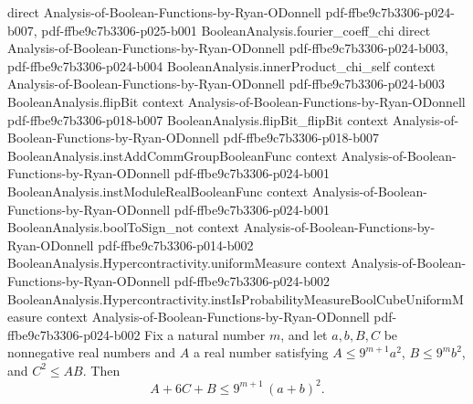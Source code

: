 \begin{lemma}
  {direct}
  {Analysis-of-Boolean-Functions-by-Ryan-ODonnell}
  {pdf-ffbe9c7b3306-p024-b007,
    pdf-ffbe9c7b3306-p025-b001}
\proofstep
  {BooleanAnalysis.fourier_coeff_chi}
  {direct}
  {Analysis-of-Boolean-Functions-by-Ryan-ODonnell}
  {pdf-ffbe9c7b3306-p024-b003,
    pdf-ffbe9c7b3306-p024-b004}
\proofstep
  {BooleanAnalysis.innerProduct_chi_self}
  {context}
  {Analysis-of-Boolean-Functions-by-Ryan-ODonnell}
  {pdf-ffbe9c7b3306-p024-b003}
\proofstep
  {BooleanAnalysis.flipBit}
  {context}
  {Analysis-of-Boolean-Functions-by-Ryan-ODonnell}
  {pdf-ffbe9c7b3306-p018-b007}
\proofstep
  {BooleanAnalysis.flipBit_flipBit}
  {context}
  {Analysis-of-Boolean-Functions-by-Ryan-ODonnell}
  {pdf-ffbe9c7b3306-p018-b007}
\proofstep
  {BooleanAnalysis.instAddCommGroupBooleanFunc}
  {context}
  {Analysis-of-Boolean-Functions-by-Ryan-ODonnell}
  {pdf-ffbe9c7b3306-p024-b001}
\proofstep
  {BooleanAnalysis.instModuleRealBooleanFunc}
  {context}
  {Analysis-of-Boolean-Functions-by-Ryan-ODonnell}
  {pdf-ffbe9c7b3306-p024-b001}
\proofstep
  {BooleanAnalysis.boolToSign_not}
  {context}
  {Analysis-of-Boolean-Functions-by-Ryan-ODonnell}
  {pdf-ffbe9c7b3306-p014-b002}
\proofstep
  {BooleanAnalysis.Hypercontractivity.uniformMeasure}
  {context}
  {Analysis-of-Boolean-Functions-by-Ryan-ODonnell}
  {pdf-ffbe9c7b3306-p024-b002}
\proofstep
  {BooleanAnalysis.Hypercontractivity.instIsProbabilityMeasureBoolCubeUniformMeasure}
  {context}
  {Analysis-of-Boolean-Functions-by-Ryan-ODonnell}
  {pdf-ffbe9c7b3306-p024-b002}
Fix a natural number $m$, and let $a, b, B, C$ be nonnegative real numbers and $A$ a
real number satisfying $A \le 9^{m+1} a^2$, $B \le 9^m b^2$, and $C^2 \le A B$. Then
\[
A + 6C + B \le 9^{m+1}\,(a+b)^2.
\]
\end{lemma}

